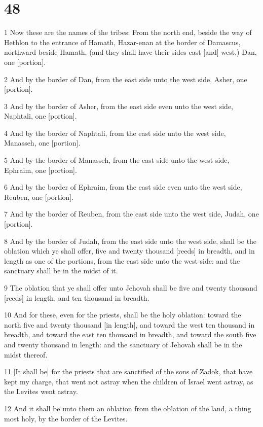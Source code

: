 \chapter{48}

\par 1 Now these are the names of the tribes: From the north end, beside the way of Hethlon to the entrance of Hamath, Hazar-enan at the border of Damascus, northward beside Hamath, (and they shall have their sides east [and] west,) Dan, one [portion].
\par 2 And by the border of Dan, from the east side unto the west side, Asher, one [portion].
\par 3 And by the border of Asher, from the east side even unto the west side, Naphtali, one [portion].
\par 4 And by the border of Naphtali, from the east side unto the west side, Manasseh, one [portion].
\par 5 And by the border of Manasseh, from the east side unto the west side, Ephraim, one [portion].
\par 6 And by the border of Ephraim, from the east side even unto the west side, Reuben, one [portion].
\par 7 And by the border of Reuben, from the east side unto the west side, Judah, one [portion].
\par 8 And by the border of Judah, from the east side unto the west side, shall be the oblation which ye shall offer, five and twenty thousand [reeds] in breadth, and in length as one of the portions, from the east side unto the west side: and the sanctuary shall be in the midst of it.
\par 9 The oblation that ye shall offer unto Jehovah shall be five and twenty thousand [reeds] in length, and ten thousand in breadth.
\par 10 And for these, even for the priests, shall be the holy oblation: toward the north five and twenty thousand [in length], and toward the west ten thousand in breadth, and toward the east ten thousand in breadth, and toward the south five and twenty thousand in length: and the sanctuary of Jehovah shall be in the midst thereof.
\par 11 [It shall be] for the priests that are sanctified of the sons of Zadok, that have kept my charge, that went not astray when the children of Israel went astray, as the Levites went astray.
\par 12 And it shall be unto them an oblation from the oblation of the land, a thing most holy, by the border of the Levites.
